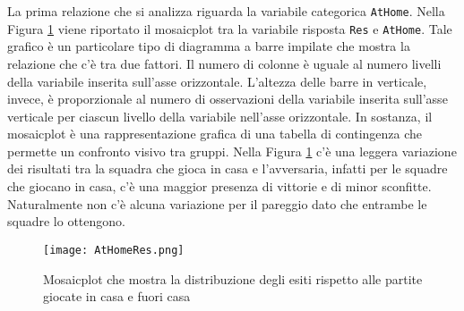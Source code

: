 La prima relazione che si analizza riguarda la variabile categorica \texttt{AtHome}. Nella Figura \ref{fig:AtHome} viene riportato il mosaicplot tra la variabile risposta \texttt{Res} e \texttt{AtHome}. Tale grafico è un particolare tipo di diagramma a barre impilate che mostra la relazione che c'è tra due fattori. Il numero di colonne è uguale al numero livelli della variabile inserita sull'asse orizzontale. L'altezza delle barre in verticale, invece, è proporzionale al numero di osservazioni della variabile inserita sull'asse verticale per ciascun livello della variabile nell'asse orizzontale.
In sostanza, il mosaicplot è una rappresentazione grafica di una tabella di contingenza che permette un confronto visivo tra gruppi. Nella Figura \ref{fig:AtHome} c'è una leggera variazione dei risultati tra la squadra che gioca in casa e l'avversaria, infatti per le squadre che giocano in casa, c'è una maggior presenza di vittorie e di minor sconfitte. Naturalmente non c'è alcuna variazione per il pareggio dato che entrambe le squadre lo ottengono.

\begin{figure}[htbp]
	\begin{center}
		\texttt{[image: AtHomeRes.png]}
		\caption{Mosaicplot che mostra la distribuzione degli esiti rispetto alle partite giocate in casa e fuori casa} \label{fig:AtHome}
	\end{center}
\end{figure}

